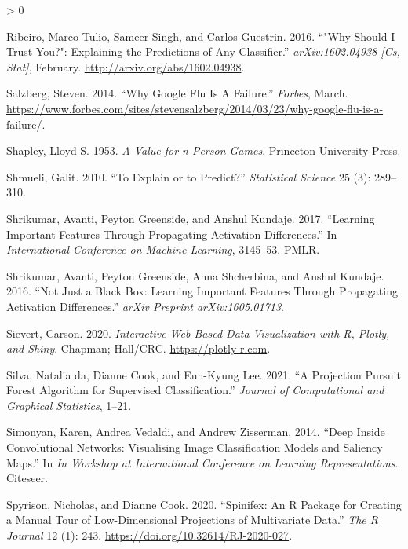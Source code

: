 \documentclass[
  article]{article}
\newlength{\cslhangindent}
\newenvironment{CSLReferences}[2] %
 {%
  \setlength{\parindent}{0pt}
  \ifodd #1 \everypar{\setlength{\hangindent}{\cslhangindent}}\ignorespaces\fi
  \ifnum #2 > 0
  \setlength{\parskip}{#2\baselineskip}
  \fi
 }%
 {}
\begin{document}
\begin{CSLReferences}{1}{0}
\leavevmode\hypertarget{ref-ribeiro_why_2016}{}%
Ribeiro, Marco Tulio, Sameer Singh, and Carlos Guestrin. 2016. {``"{Why} {Should} {I} {Trust} {You}?": {Explaining} the {Predictions} of {Any} {Classifier}.''} \emph{arXiv:1602.04938 {[}Cs, Stat{]}}, February. \url{http://arxiv.org/abs/1602.04938}.

\leavevmode\hypertarget{ref-salzberg_why_2014}{}%
Salzberg, Steven. 2014. {``Why {Google} {Flu} {Is} {A} {Failure}.''} \emph{Forbes}, March. \url{https://www.forbes.com/sites/stevensalzberg/2014/03/23/why-google-flu-is-a-failure/}.

\leavevmode\hypertarget{ref-shapley_value_1953}{}%
Shapley, Lloyd S. 1953. \emph{A Value for n-Person Games}. Princeton University Press.

\leavevmode\hypertarget{ref-shmueli_explain_2010}{}%
Shmueli, Galit. 2010. {``To Explain or to Predict?''} \emph{Statistical Science} 25 (3): 289--310.

\leavevmode\hypertarget{ref-shrikumar_learning_2017}{}%
Shrikumar, Avanti, Peyton Greenside, and Anshul Kundaje. 2017. {``Learning Important Features Through Propagating Activation Differences.''} In \emph{International {Conference} on {Machine} {Learning}}, 3145--53. PMLR.

\leavevmode\hypertarget{ref-shrikumar_not_2016}{}%
Shrikumar, Avanti, Peyton Greenside, Anna Shcherbina, and Anshul Kundaje. 2016. {``Not Just a Black Box: {Learning} Important Features Through Propagating Activation Differences.''} \emph{arXiv Preprint arXiv:1605.01713}.

\leavevmode\hypertarget{ref-sievert_interactive_2020}{}%
Sievert, Carson. 2020. \emph{Interactive {Web}-{Based} {Data} {Visualization} with {R}, Plotly, and Shiny}. Chapman; Hall/CRC. \url{https://plotly-r.com}.

\leavevmode\hypertarget{ref-da_silva_projection_2021}{}%
Silva, Natalia da, Dianne Cook, and Eun-Kyung Lee. 2021. {``A {Projection} {Pursuit} {Forest} {Algorithm} for {Supervised} {Classification}.''} \emph{Journal of Computational and Graphical Statistics}, 1--21.

\leavevmode\hypertarget{ref-simonyan_deep_2014}{}%
Simonyan, Karen, Andrea Vedaldi, and Andrew Zisserman. 2014. {``Deep Inside Convolutional Networks: {Visualising} Image Classification Models and Saliency Maps.''} In \emph{In {Workshop} at {International} {Conference} on {Learning} {Representations}}. Citeseer.

\leavevmode\hypertarget{ref-spyrison_spinifex_2020}{}%
Spyrison, Nicholas, and Dianne Cook. 2020. {``Spinifex: An {R} {Package} for {Creating} a {Manual} {Tour} of {Low}-Dimensional {Projections} of {Multivariate} {Data}.''} \emph{The R Journal} 12 (1): 243. \url{https://doi.org/10.32614/RJ-2020-027}.


\end{CSLReferences}
\end{document}

